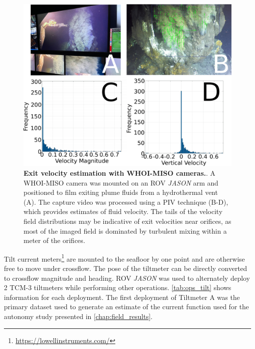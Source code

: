 \begin{figure}[h!]
  \centering
  \includegraphics[width=0.8\columnwidth]{figures/ops_miso.png}
  \caption[Exit velocity estimation with WHOI-MISO cameras]{\textbf{Exit velocity estimation with WHOI-MISO cameras.}. A WHOI-MISO camera was mounted on an ROV \emph{JASON} arm and positioned to film exiting plume fluids from a hydrothermal vent (A). The capture video was processed using a PIV technique (B-D), which provides estimates of fluid velocity. The tails of the velocity field distributions may be indicative of exit velocities near orifices, as most of the imaged field is dominated by turbulent mixing within a meter of the orifices.}
  \label{fig:ops_miso}
\end{figure}

Tilt current meters\footnote{\url{https://lowellinstruments.com/}} are mounted to the seafloor by one point and are otherwise free to move under crossflow. The pose of the tiltmeter can be directly converted to crossflow magnitude and heading. ROV \emph{JASON} was used to alternately deploy 2 TCM-3 tiltmeters while performing other operations. \cref{tab:ops_tilt} shows information for each deployment. The first deployment of Tiltmeter A was the primary dataset used to generate an estimate of the current function used for the autonomy study presented in \cref{chap:field_results}. 

